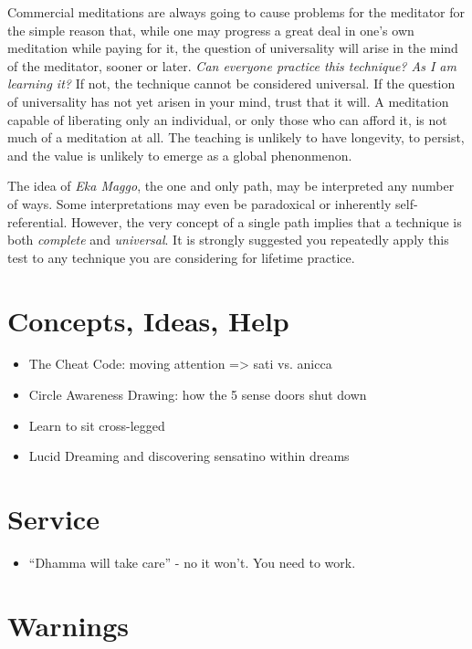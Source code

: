 \documentclass[a4paper, amsfonts, amssymb, amsmath, reprint, showkeys, nofootinbib, twoside]{revtex4-1}
\begin{document}
Commercial meditations are always going to cause problems for the meditator for the
simple reason that, while one may progress a great deal in one's own meditation while
paying for it, the question of universality will arise in the mind of the meditator,
sooner or later. \textit{Can everyone practice this technique? As I am learning it?}
If not, the technique cannot be considered universal. If the question of universality
has not yet arisen in your mind, trust that it will. A meditation capable of
liberating only an individual, or only those who can afford it, is not much of a
meditation at all. The teaching is unlikely to have longevity, to persist, and the
value is unlikely to emerge as a global phenonmenon.

The idea of \textit{Eka Maggo}, the one and only path, may be interpreted any number
of ways. Some interpretations may even be paradoxical or inherently
self-referential. However, the very concept of a single path implies that a technique
is both \textit{complete} and \textit{universal}. It is strongly suggested you
repeatedly apply this test to any technique you are considering for lifetime
practice.

\section{Concepts, Ideas, Help}

\begin{itemize}
  \item The Cheat Code: moving attention => sati vs. anicca
  \item Circle Awareness Drawing: how the 5 sense doors shut down
  \item Learn to sit cross-legged
  \item Lucid Dreaming and discovering sensatino within dreams
\end{itemize}

\section{Service}

\begin{itemize}
  \item ``Dhamma will take care'' - no it won't. You need to work.
\end{itemize}

\section{Warnings}
\end{document}
